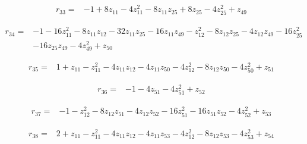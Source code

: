 \par\noindent\begin{minipage}{\linewidth}
\begin{align*}
r_{33}={}&-1+8z_{11}-4z_{11}^{2}-8z_{11}z_{25}+8z_{25}-4z_{25}^{2}+z_{49}
\end{align*}
\end{minipage}\par
\par\noindent\begin{minipage}{\linewidth}
\begin{align*}
r_{34}={}&-1-16z_{11}^{2}-8z_{11}z_{12}-32z_{11}z_{25}-16z_{11}z_{49}-z_{12}^{2}-8z_{12}z_{25}-4z_{12}z_{49}-16z_{25}^{2}\\[-2pt]
&-16z_{25}z_{49}-4z_{49}^{2}+z_{50}
\end{align*}
\end{minipage}\par
\par\noindent\begin{minipage}{\linewidth}
\begin{align*}
r_{35}={}&1+z_{11}-z_{11}^{2}-4z_{11}z_{12}-4z_{11}z_{50}-4z_{12}^{2}-8z_{12}z_{50}-4z_{50}^{2}+z_{51}
\end{align*}
\end{minipage}\par
\par\noindent\begin{minipage}{\linewidth}
\begin{align*}
r_{36}={}&-1-4z_{51}-4z_{51}^{2}+z_{52}
\end{align*}
\end{minipage}\par
\par\noindent\begin{minipage}{\linewidth}
\begin{align*}
r_{37}={}&-1-z_{12}^{2}-8z_{12}z_{51}-4z_{12}z_{52}-16z_{51}^{2}-16z_{51}z_{52}-4z_{52}^{2}+z_{53}
\end{align*}
\end{minipage}\par
\par\noindent\begin{minipage}{\linewidth}
\begin{align*}
r_{38}={}&2+z_{11}-z_{11}^{2}-4z_{11}z_{12}-4z_{11}z_{53}-4z_{12}^{2}-8z_{12}z_{53}-4z_{53}^{2}+z_{54}
\end{align*}
\end{minipage}\par
